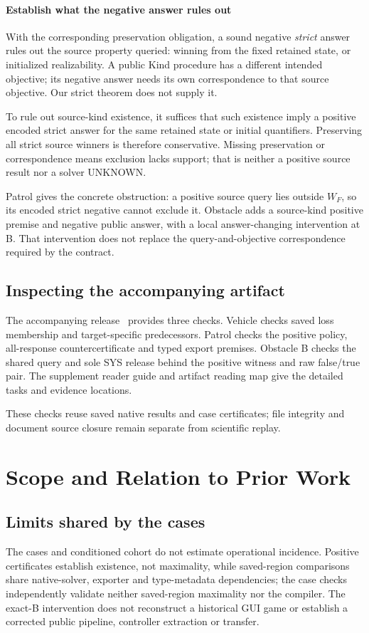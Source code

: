 \paragraph{Establish what the negative answer rules out}
With the corresponding preservation obligation, a sound negative
\emph{strict} answer rules out the source property queried: winning from
the fixed retained state, or initialized realizability. A public Kind procedure
has a different intended objective; its negative answer needs its own
correspondence to that source objective. Our strict theorem does not supply
it.

To rule out source-kind existence, it suffices that such existence imply
a positive encoded strict answer for the same retained state or initial
quantifiers. Preserving all strict source winners is therefore conservative.
Missing preservation or correspondence means exclusion lacks support;
that is neither a positive source result nor a solver UNKNOWN.

Patrol gives the concrete obstruction: a positive source query lies outside
$W_F$, so its encoded strict negative cannot exclude it. Obstacle adds a
source-kind positive premise and negative public answer, with a local
answer-changing intervention at B. That intervention does not replace the
query-and-objective correspondence required by the contract.

\subsection{Inspecting the accompanying artifact}\label{sec:artifact}
The accompanying release~\cite{artifactrepository} provides three checks.
Vehicle checks saved loss membership and target-specific predecessors.
Patrol checks the positive policy, all-response countercertificate and typed
export premises. Obstacle B checks the shared query and sole SYS release
behind the positive witness and raw false/true pair.
The supplement reader guide and artifact reading map give the
detailed tasks and evidence locations.

These checks reuse saved native results and case certificates; file integrity
and document source closure remain separate from scientific replay.

\section{Scope and Relation to Prior Work}\label{sec:scope}
\subsection{Limits shared by the cases}
The cases and conditioned cohort do not estimate operational incidence.
Positive certificates establish existence, not maximality, while saved-region
comparisons share native-solver, exporter and type-metadata dependencies;
the case checks independently validate neither saved-region maximality
nor the compiler. The exact-B intervention does not reconstruct a historical
GUI game or establish a corrected public pipeline, controller extraction
or transfer.

